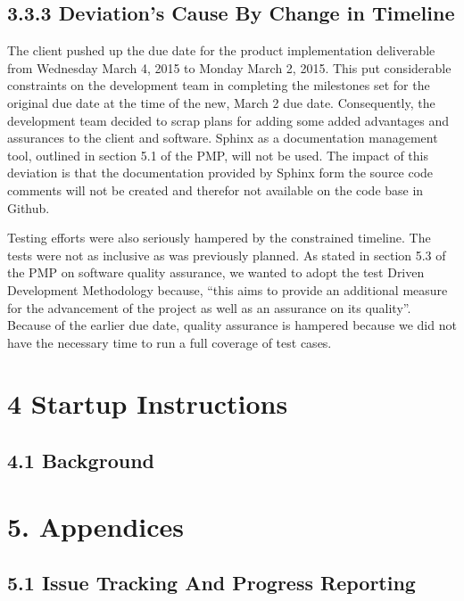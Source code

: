 \documentclass[]{article}
\begin{document}
\subsection{\textbf{3.3.3 Deviation's Cause By Change in
Timeline}}\label{deviations-cause-by-change-in-timeline}

The client pushed up the due date for the product implementation
deliverable from Wednesday March 4, 2015 to Monday March 2, 2015. This
put considerable constraints on the development team in completing the
milestones set for the original due date at the time of the new, March 2
due date. Consequently, the development team decided to scrap plans for
adding some added advantages and assurances to the client and software.
Sphinx as a documentation management tool, outlined in section 5.1 of
the PMP, will not be used. The impact of this deviation is that the
documentation provided by Sphinx form the source code comments will not
be created and therefor not available on the code base in Github.

Testing efforts were also seriously hampered by the constrained
timeline. The tests were not as inclusive as was previously planned. As
stated in section 5.3 of the PMP on software quality assurance, we
wanted to adopt the test Driven Development Methodology because, ``this
aims to provide an additional measure for the advancement of the project
as well as an assurance on its quality''. Because of the earlier due
date, quality assurance is hampered because we did not have the
necessary time to run a full coverage of test cases.

\section{4 Startup Instructions}\label{startup-instructions}

\subsection{4.1 Background}\label{background}

\section{\textbf{5. Appendices}}\label{appendices}

\subsection{\textbf{5.1 Issue Tracking And Progress
Reporting}}\label{issue-tracking-and-progress-reporting}
\end{document}
